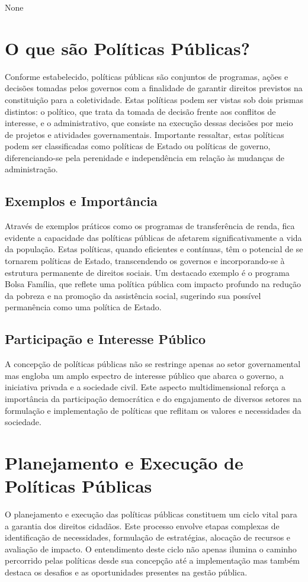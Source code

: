 \documentclass[
   article,       
   12pt,          
   oneside,       
   a4paper,       
   english,       
   brazil,        
   sumario=tradicional
   ]{abntex2}
\begin{document}
None

\section{O que são Políticas Públicas?}
Conforme estabelecido, políticas públicas são conjuntos de programas, ações e decisões tomadas pelos governos com a finalidade de garantir direitos previstos na constituição para a coletividade. Estas políticas podem ser vistas sob dois prismas distintos: o político, que trata da tomada de decisão frente aos conflitos de interesse, e o administrativo, que consiste na execução dessas decisões por meio de projetos e atividades governamentais. Importante ressaltar, estas políticas podem ser classificadas como políticas de Estado ou políticas de governo, diferenciando-se pela perenidade e independência em relação às mudanças de administração.

\subsection{Exemplos e Importância}
Através de exemplos práticos como os programas de transferência de renda, fica evidente a capacidade das políticas públicas de afetarem significativamente a vida da população. Estas políticas, quando eficientes e contínuas, têm o potencial de se tornarem políticas de Estado, transcendendo os governos e incorporando-se à estrutura permanente de direitos sociais. Um destacado exemplo é o programa Bolsa Família, que reflete uma política pública com impacto profundo na redução da pobreza e na promoção da assistência social, sugerindo sua possível permanência como uma política de Estado.

\subsection{Participação e Interesse Público}
A concepção de políticas públicas não se restringe apenas ao setor governamental mas engloba um amplo espectro de interesse público que abarca o governo, a iniciativa privada e a sociedade civil. Este aspecto multidimensional reforça a importância da participação democrática e do engajamento de diversos setores na formulação e implementação de políticas que reflitam os valores e necessidades da sociedade.

\section{Planejamento e Execução de Políticas Públicas}
O planejamento e execução das políticas públicas constituem um ciclo vital para a garantia dos direitos cidadãos. Este processo envolve etapas complexas de identificação de necessidades, formulação de estratégias, alocação de recursos e avaliação de impacto. O entendimento deste ciclo não apenas ilumina o caminho percorrido pelas políticas desde sua concepção até a implementação mas também destaca os desafios e as oportunidades presentes na gestão pública.
\end{document}
